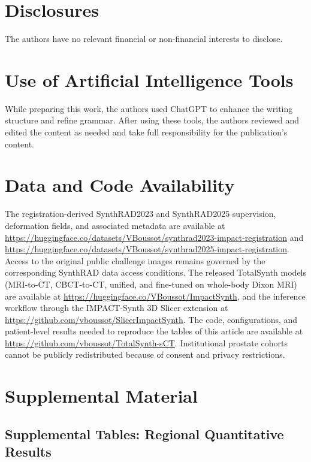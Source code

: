 \documentclass{article}
\begin{document}
\section{Disclosures}
The authors have no relevant financial or non-financial interests to disclose.

\section{Use of Artificial Intelligence Tools}
While preparing this work, the authors used ChatGPT to enhance the writing structure and refine grammar. After using these tools, the authors reviewed and edited the content as needed and take full responsibility for the publication's content.

\section{Data and Code Availability}
The registration-derived SynthRAD2023 and SynthRAD2025 supervision, deformation fields, and associated metadata are available at \url{https://huggingface.co/datasets/VBoussot/synthrad2023-impact-registration} and \url{https://huggingface.co/datasets/VBoussot/synthrad2025-impact-registration}. Access to the original public challenge images remains governed by the corresponding SynthRAD data access conditions. The released TotalSynth models (MRI-to-CT, CBCT-to-CT, unified, and fine-tuned on whole-body Dixon MRI) are available at \url{https://huggingface.co/VBoussot/ImpactSynth}, and the inference workflow through the IMPACT-Synth 3D Slicer extension at \url{https://github.com/vboussot/SlicerImpactSynth}. The code, configurations, and patient-level results needed to reproduce the tables of this article are available at \url{https://github.com/vboussot/TotalSynth-sCT}. Institutional prostate cohorts cannot be publicly redistributed because of consent and privacy restrictions.


  


\clearpage

\section*{Supplemental Material}
\setcounter{table}{0}
\renewcommand{\thetable}{S\arabic{table}}
\setcounter{figure}{0}
\renewcommand{\thefigure}{S\arabic{figure}}

\subsection*{Supplemental Tables: Regional Quantitative Results}
\end{document}
